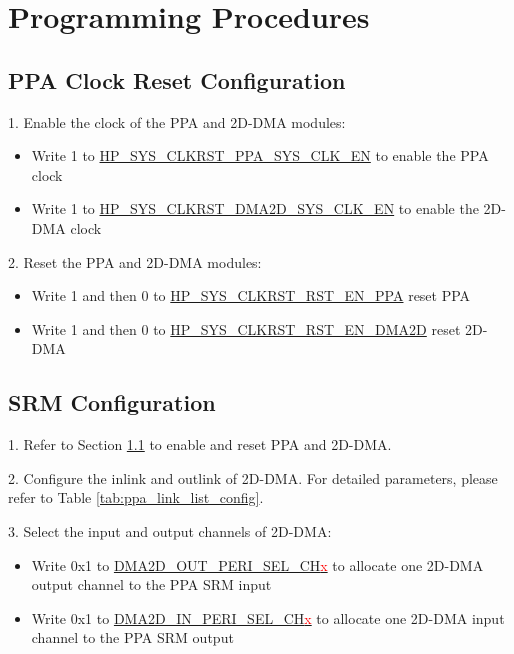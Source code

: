 \documentclass[main\_\_EN.tex]{subfiles}
\begin{document}

\section{Programming Procedures}
\label{sec:ppa-prog-procedures}

\subsection{PPA Clock Reset Configuration}
\label{sec:ppa_clk_rst}

1. Enable the clock of the PPA and 2D-DMA modules:
\begin{itemize}
    \item Write 1 to \hyperref[fielddesc:HPSYSCLKRSTPPASYSCLKEN]{HP\_SYS\_CLKRST\_PPA\_SYS\_CLK\_EN} to enable the PPA clock
    \item Write 1 to \hyperref[fielddesc:HPSYSCLKRSTDMA2DSYSCLKEN]{HP\_SYS\_CLKRST\_DMA2D\_SYS\_CLK\_EN} to enable the 2D-DMA clock
\end{itemize}

2. Reset the PPA and 2D-DMA modules:
\begin{itemize}
    \item Write 1 and then 0 to \hyperref[fielddesc:HPSYSCLKRSTRSTENPPA]{HP\_SYS\_CLKRST\_RST\_EN\_PPA} reset PPA
    \item Write 1 and then 0 to \hyperref[fielddesc:HPSYSCLKRSTRSTENDMA2D]{HP\_SYS\_CLKRST\_RST\_EN\_DMA2D} reset 2D-DMA
\end{itemize}

\subsection{SRM Configuration}

1. Refer to Section \ref{sec:ppa_clk_rst} to enable and reset PPA and 2D-DMA.

2. Configure the inlink and outlink of 2D-DMA. For detailed parameters, please refer to Table \ref{tab:ppa_link_list_config}.

3. Select the input and output channels of 2D-DMA:
\begin{itemize}
    \item Write 0x1 to \hyperref[fielddesc:DMA2DOUTPERISELCHN]{DMA2D\_OUT\_PERI\_SEL\_CH\textcolor{red}{x}} to allocate one 2D-DMA output channel to the PPA SRM input
    \item Write 0x1 to \hyperref[fielddesc:DMA2DINPERISELCHN]{DMA2D\_IN\_PERI\_SEL\_CH\textcolor{red}{x}} to allocate one 2D-DMA input channel to the PPA SRM output
\end{itemize}
\end{document}
